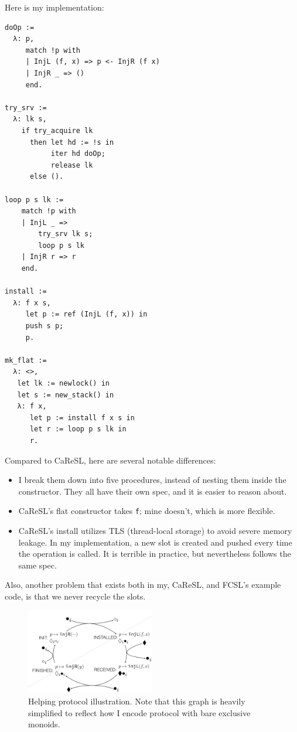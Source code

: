 \documentclass[11pt]{article}
\begin{document}
Here is my implementation:

\begin{verbatim}
doOp :=
  λ: p,
     match !p with
     | InjL (f, x) => p <- InjR (f x)
     | InjR _ => ()
     end.

try_srv :=
  λ: lk s,
    if try_acquire lk
      then let hd := !s in
           iter hd doOp;
           release lk
      else ().

loop p s lk :=
    match !p with
    | InjL _ =>
        try_srv lk s;
        loop p s lk
    | InjR r => r
    end.

install :=
  λ: f x s,
     let p := ref (InjL (f, x)) in
     push s p;
     p.

mk_flat :=
  λ: <>,
   let lk := newlock() in
   let s := new_stack() in
   λ: f x,
      let p := install f x s in
      let r := loop p s lk in
      r.
\end{verbatim}

Compared to CaReSL, here are several notable differences:

\begin{itemize}
\item I break them down into five procedures, instead of nesting them inside the constructor. They all have their own spec, and it is easier to reason about.
\item CaReSL’s flat constructor takes \texttt{f}; mine doesn’t, which is more flexible.
\item CaReSL’s install utilizes TLS (thread-local storage) to avoid severe memory leakage. In my implementation, a new slot is created and pushed every time the operation is called. It is terrible in practice, but nevertheless follows the same spec.
\end{itemize}

Also, another problem that exists both in my, CaReSL, and FCSL’s example code, is that we never recycle the slots.

\begin{figure}[hb]
  \centering
  \includegraphics[width=0.5\textwidth]{helping}
  \caption{Helping protocol illustration. Note that this graph is heavily simplified to reflect how I encode protocol with bare exclusive monoids.}
\end{figure}
\end{document}
